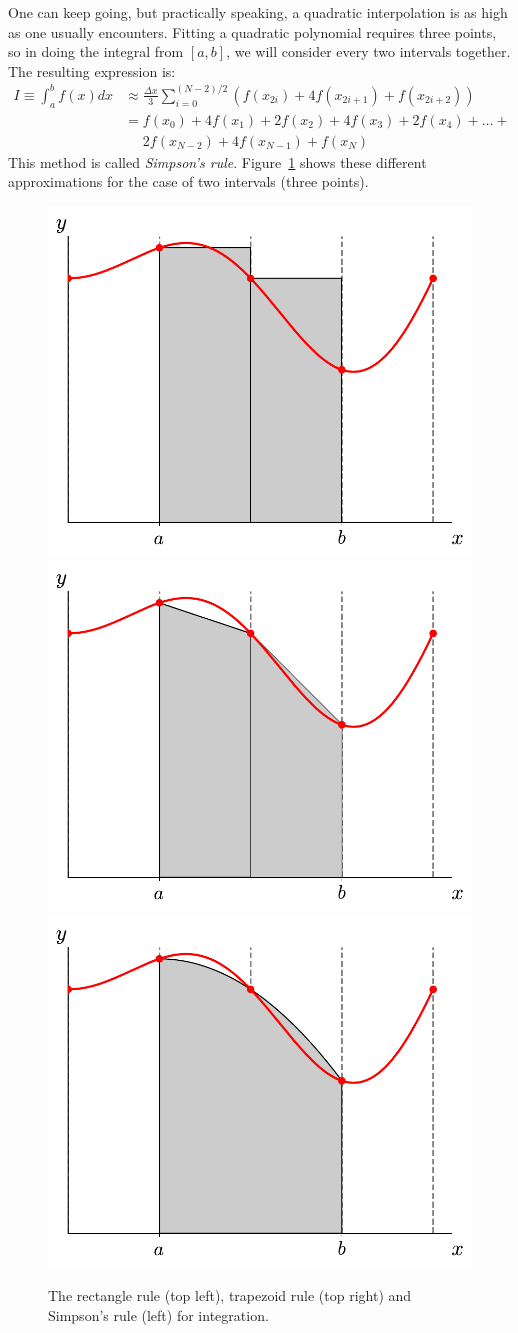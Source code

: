 One can keep going, but practically speaking, a quadratic interpolation
is as high as one usually encounters.  Fitting a quadratic polynomial 
requires three points, so in doing the integral from $[a,b]$, we will
consider every two intervals together.  The resulting expression is:
\begin{align}
I \equiv \int_a^b f(x) dx &\approx 
  \frac{\Delta x}{3} \sum_{i = 0}^{(N-2)/2} (f(x_{2i}) + 4 f(x_{2i+1}) + f(x_{2i+2}) ) \\
&= f(x_0) + 4f(x_1) + 2f(x_2) + 4f(x_3) + 2f(x_4) + \ldots + \nonumber \\
&\phantom{=} 2f(x_{N-2}) + 4f(x_{N-1}) + f(x_N)
\end{align}
This method is called {\em Simpson's rule}.  Figure~\ref{fig:integration} shows
these different approximations for the case of two intervals (three points).

\begin{figure}
\centering
\includegraphics[width=0.49\linewidth]{rectangle}
\includegraphics[width=0.49\linewidth]{trapezoid} \\
\includegraphics[width=0.49\linewidth]{simpsons}
\begin{minipage}[b]{0.49\linewidth}
\caption[Integration rules]{\label{fig:integration} The rectangle rule
  (top left), trapezoid rule (top right) and Simpson's rule (left) for
  integration.}
\end{minipage}
\end{figure}

